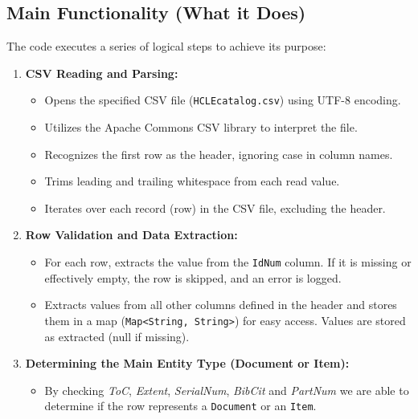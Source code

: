 \subsection{Main Functionality (What it Does)}
The code executes a series of logical steps to achieve its purpose:

\begin{enumerate}
    \item \textbf{CSV Reading and Parsing:}
        \begin{itemize}
            \item Opens the specified CSV file (\texttt{HCLEcatalog.csv}) using UTF-8 encoding.
            \item Utilizes the Apache Commons CSV library to interpret the file.
            \item Recognizes the first row as the header, ignoring case in column names.
            \item Trims leading and trailing whitespace from each read value.
            \item Iterates over each record (row) in the CSV file, excluding the header.
        \end{itemize}

    \item \textbf{Row Validation and Data Extraction:}
        \begin{itemize}
            \item For each row, extracts the value from the \texttt{IdNum} column. If it is missing or effectively empty, the row is skipped, and an error is logged.
            \item Extracts values from all other columns defined in the header and stores them in a map (\texttt{Map<String, String>}) for easy access. Values are stored as extracted (null if missing).
        \end{itemize}

    \item \textbf{Determining the Main Entity Type (Document or Item):}
        \begin{itemize}
            \item By checking \textit{ToC}, \textit{Extent}, \textit{SerialNum}, \textit{BibCit} and \textit{PartNum} we are able to determine if the row represents a \texttt{Document} or an \texttt{Item}. 
        \end{itemize}


\end{enumerate}
